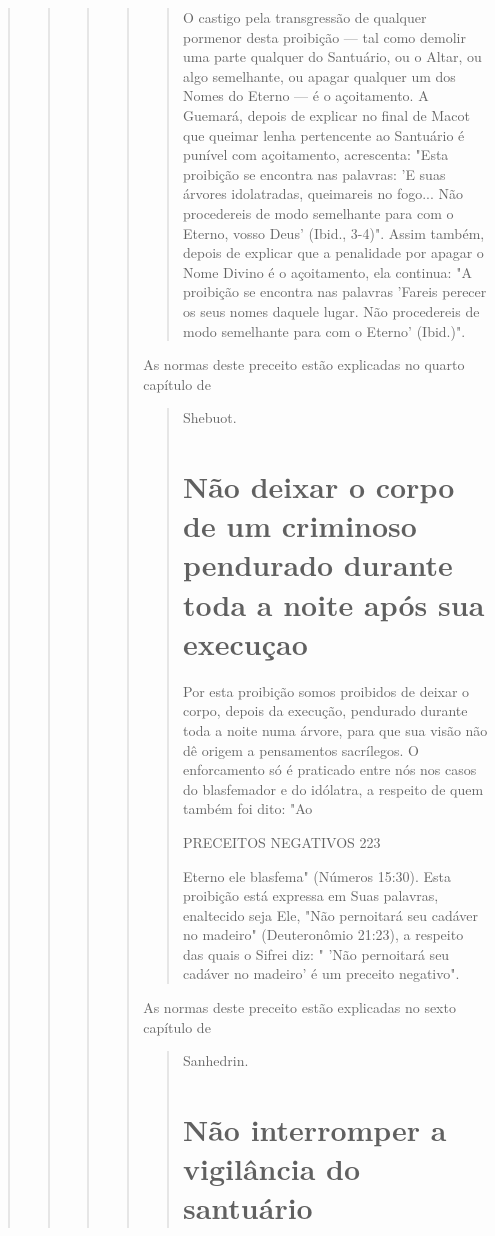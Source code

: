 \begin{quote}
\begin{quote}
\begin{quote}
\begin{quote}
\begin{quote}
O castigo pela transgressão de qualquer pormenor desta proibição --- tal
como demolir uma parte qualquer do Santuário, ou o Altar, ou algo
se­melhante, ou apagar qualquer um dos Nomes do Eterno --- é o
açoitamento. A Guemará, depois de explicar no final de Macot que queimar
lenha pertencen­te ao Santuário é punível com açoitamento, acrescenta:
"Esta proibição se en­contra nas palavras: 'E suas árvores idolatradas,
queimareis no fogo... Não pro­cedereis de modo semelhante para com o
Eterno, vosso Deus' (Ibid., 3-4)". As­sim também, depois de explicar que
a penalidade por apagar o Nome Divino é o açoitamento, ela continua: "A
proibição se encontra nas palavras 'Fareis perecer os seus nomes daquele
lugar. Não procedereis de modo semelhante para com o Eterno' (Ibid.)".
\end{quote}

As normas deste preceito estão explicadas no quarto capítulo de

\begin{quote}
Shebuot.

\section{Não deixar o corpo de um criminoso pendurado durante 
toda a noite após sua execuçao}

Por esta proibição somos proibidos de deixar o corpo, depois da
exe­cução, pendurado durante toda a noite numa árvore, para que sua
visão não dê origem a pensamentos sacrílegos. O enforcamento só é
praticado entre nós nos casos do blasfemador e do idólatra, a respeito
de quem também foi dito: "Ao

PRECEITOS NEGATIVOS 223

Eterno ele blasfema" (Números 15:30). Esta proibição está expressa em
Suas palavras, enaltecido seja Ele, "Não pernoitará seu cadáver no
madeiro" (Deute­ronômio 21:23), a respeito das quais o Sifrei diz: "
'Não pernoitará seu cadáver no madeiro' é um preceito negativo".
\end{quote}

As normas deste preceito estão explicadas no sexto capítulo de

\begin{quote}
Sanhedrin.

\section{Não interromper a vigilância do santuário}


\end{quote}
\end{quote}
\end{quote}
\end{quote}
\end{quote}
